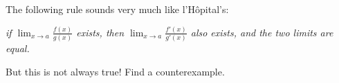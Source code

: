 The following rule sounds very much
like l'H\^{o}pital's:
\begin{center}
  \itshape if $\displaystyle\lim_{x\to a} \frac{f(x)} {g(x)}$ exists,
  then $\displaystyle\lim_{x\to a} \frac{f'(x)} {g'(x)}$ also exists,
  and the two limits are equal.
\end{center}
But this is not always true!  Find a counterexample.
